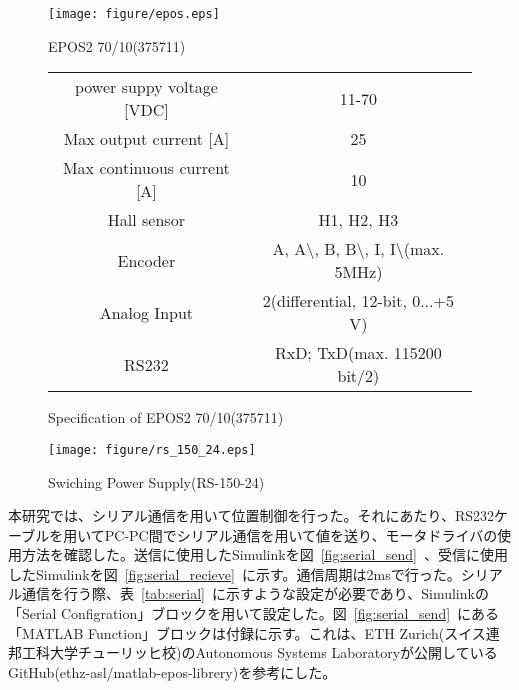 \documentclass[a4paper,12pt]{article_vdlab_sotsuron}
\begin{document}
\vspace*{10mm}
\begin{figure}[htp]
  \begin{minipage}{0.4\textwidth}
    \begin{center}
      \texttt{[image: figure/epos.eps]}
      \vspace*{3mm}
      \caption{EPOS2 70/10(375711)}
    \label{fig:epos}
    \end{center}
  \end{minipage}
  \begin{minipage}{0.6\textwidth}
      \begin{center}
	\makeatletter
	\def\@captype{table}   
	\makeatother
	\caption{Specification of EPOS2 70/10(375711)}
	\label{tab:epos}
	\begin{tabular}{cc}\hline
	  power suppy voltage [VDC] & 11-70\\
	  Max output current [A] & 25\\
	  Max continuous current [A] & 10\\
	  Hall sensor & H1, H2, H3 \\
	  Encoder & A, A$\setminus$, B, B$\setminus$, I, I$\setminus$(max. 5MHz)\\
	  Analog Input & 2(differential, 12-bit, 0...+5 V)\\
	  RS232 & RxD; TxD(max. 115200 bit/2) \\\hline 
	  \end{tabular}  
	\end{center}
  \end{minipage}
\end{figure}

\vspace*{10mm}
\begin{figure}[htp]
  \begin{center}
    \texttt{[image: figure/rs\_150\_24.eps]}
    \vspace*{3mm}
    \caption{Swiching Power Supply(RS-150-24)}
    \label{fig:rs_150_24}
  \end{center}
\end{figure}

\newpage
本研究では、シリアル通信を用いて位置制御を行った。それにあたり、RS232ケーブルを用いてPC-PC間でシリアル通信を用いて値を送り、モータドライバの使用方法を確認した。送信に使用したSimulinkを図~\ref{fig:serial_send}~、受信に使用したSimulinkを図~\ref{fig:serial_recieve}~に示す。通信周期は2msで行った。シリアル通信を行う際、表~\ref{tab:serial}~に示すような設定が必要であり、Simulinkの「Serial Configration」ブロックを用いて設定した。図~\ref{fig:serial_send}~にある「MATLAB Function」ブロックは付録に示す。これは、ETH Zurich(スイス連邦工科大学チューリッヒ校)のAutonomous Systems Laboratoryが公開しているGitHub(ethz-asl/matlab-epos-librery)を参考にした。\cite{99}
\end{document}
